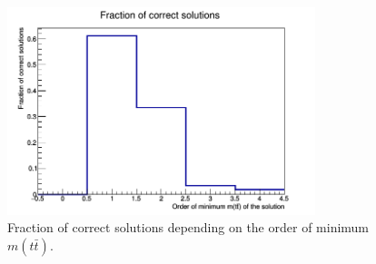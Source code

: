 \begin{figure}[t]
  \centering
  \includegraphics[width=0.8\textwidth]{10_appendices/min_Mtt/plots/corrMinMtt.png}
  \caption{Fraction of correct solutions depending on the order of minimum $m(t\bar{t})$.}
  \label{fig:corrMinMtt}
\end{figure}

